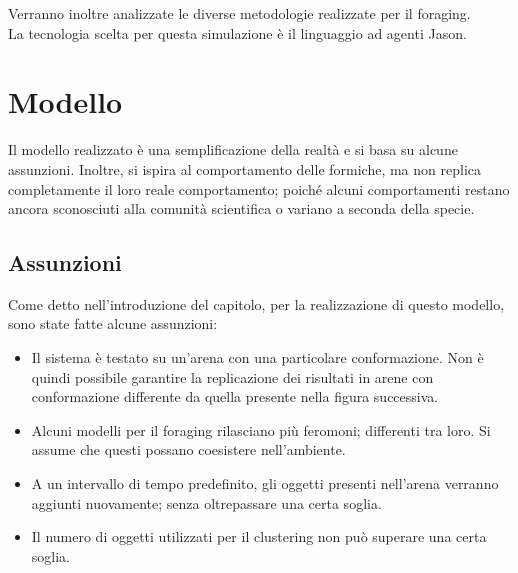 \documentclass[12pt,a4paper,openright,twoside]{report}
\begin{document}
Verranno inoltre analizzate le diverse metodologie realizzate per il foraging.\\
La tecnologia scelta per questa simulazione è il linguaggio ad agenti Jason.
	\clearpage{\pagestyle{empty}\cleardoublepage}
	\tableofcontents                        %
	\rhead[\fancyplain{}{\bfseries\leftmark}]{\fancyplain{}{\bfseries\thepage}}
	\clearpage{\pagestyle{empty}\cleardoublepage}
	\clearpage{\pagestyle{empty}\cleardoublepage}
	\clearpage{\pagestyle{empty}\cleardoublepage}
	\chapter{Modello}                %
	\lhead[\fancyplain{}{\bfseries\thepage}]{\fancyplain{}{\bfseries\rightmark}}

Il modello realizzato è una semplificazione della realtà e si basa su alcune assunzioni. Inoltre, si ispira al comportamento delle formiche, ma non replica completamente il loro reale comportamento; poiché alcuni comportamenti restano ancora sconosciuti alla comunità scientifica o variano a seconda della specie.

\section{Assunzioni}

Come detto nell'introduzione del capitolo, per la realizzazione di questo modello, sono state fatte alcune assunzioni:

\begin{itemize}
	\item Il sistema è testato su un'arena con una particolare conformazione. Non è quindi possibile garantire la replicazione dei risultati in arene con conformazione differente da quella presente nella figura successiva.
	\item Alcuni modelli per il foraging rilasciano più feromoni; differenti tra loro. Si assume che questi possano coesistere nell'ambiente.
	\item A un intervallo di tempo predefinito, gli oggetti presenti nell'arena verranno aggiunti nuovamente; senza  oltrepassare una certa soglia.
	\item Il numero di oggetti utilizzati per il clustering non può superare una certa soglia.
\end{itemize}
\end{document}
